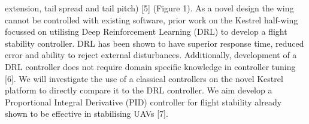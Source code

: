     extension, tail spread and tail pitch) [5]
    (Figure 1).
    As a novel design
    the wing cannot be controlled with existing software, prior work on the
    Kestrel half-wing focussed on utilising Deep Reinforcement Learning
    (DRL) to develop a flight stability controller. DRL has been shown
    to have superior response time, reduced error and ability to reject
    external disturbances. Additionally, development of a DRL controller
    does not require domain specific knowledge in controller tuning [6].
    \vspace{\baselineskip}
    We will investigate the use of a classical controllers on the novel
    Kestrel platform to directly compare it to the DRL controller.
    We aim develop a Proportional Integral Derivative (PID) controller
    for flight stability already shown to be effective in stabilising UAVs
    [7].
    \vspace{\baselineskip}

